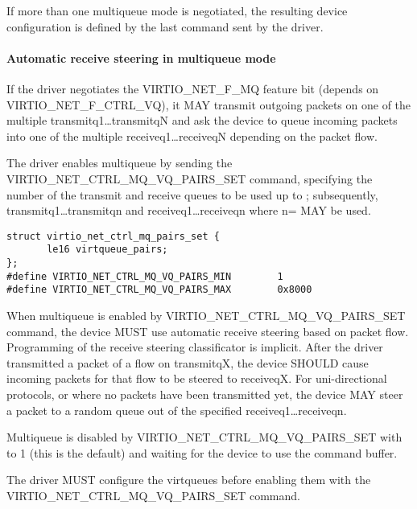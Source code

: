 If more than one multiqueue mode is negotiated, the resulting device configuration is defined by the last command sent by the driver.

\paragraph{Automatic receive steering in multiqueue mode}\label{sec:Device Types / Network Device / Device Operation / Control Virtqueue / Automatic receive steering in multiqueue mode}

If the driver negotiates the VIRTIO_NET_F_MQ feature bit (depends on VIRTIO_NET_F_CTRL_VQ), it MAY transmit outgoing packets on one
of the multiple transmitq1\ldots transmitqN and ask the device to
queue incoming packets into one of the multiple receiveq1\ldots receiveqN
depending on the packet flow.

The driver enables multiqueue by
sending the VIRTIO_NET_CTRL_MQ_VQ_PAIRS_SET command, specifying
the number of the transmit and receive queues to be used up to
; subsequently,
transmitq1\ldots transmitqn and receiveq1\ldots receiveqn where
n= MAY be used.
\begin{lstlisting}
struct virtio_net_ctrl_mq_pairs_set {
       le16 virtqueue_pairs;
};
#define VIRTIO_NET_CTRL_MQ_VQ_PAIRS_MIN        1
#define VIRTIO_NET_CTRL_MQ_VQ_PAIRS_MAX        0x8000

\end{lstlisting}

When multiqueue is enabled by VIRTIO_NET_CTRL_MQ_VQ_PAIRS_SET command, the device MUST use automatic receive steering
based on packet flow. Programming of the receive steering
classificator is implicit. After the driver transmitted a packet of a
flow on transmitqX, the device SHOULD cause incoming packets for that flow to
be steered to receiveqX. For uni-directional protocols, or where
no packets have been transmitted yet, the device MAY steer a packet
to a random queue out of the specified receiveq1\ldots receiveqn.

Multiqueue is disabled by VIRTIO_NET_CTRL_MQ_VQ_PAIRS_SET with  to 1 (this is
the default) and waiting for the device to use the command buffer.


The driver MUST configure the virtqueues before enabling them with the 
VIRTIO_NET_CTRL_MQ_VQ_PAIRS_SET command.

